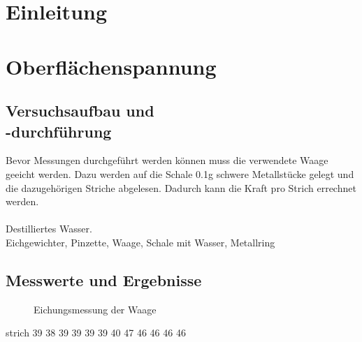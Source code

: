 \documentclass[12pt,a4paper]{article}
\begin{document}
\pagebreak
\setlength{\columnsep}{20pt}
\begin{multicols}{2}
\section{Einleitung}

\section{Oberflächenspannung}

\subsection{Versuchsaufbau und \\-durchführung}
Bevor Messungen durchgeführt werden können muss die verwendete Waage geeicht werden. Dazu werden auf die Schale 0.1g schwere Metallstücke gelegt und die dazugehörigen Striche abgelesen. Dadurch kann die Kraft pro Strich errechnet werden. \\
\\
Destilliertes Wasser.\\
Eichgewichter, Pinzette, Waage, Schale mit Wasser, Metallring\\
\subsection{Messwerte und Ergebnisse}

\begin{figure}[H]
	\centering
	\caption{Eichungsmessung der Waage}
	\label{fig:oberflaeche_eichung}
\end{figure}
\noindent

strich
39
38
39
39
39
39
40
47
46
46
46
46


\end{multicols}
\end{document}
